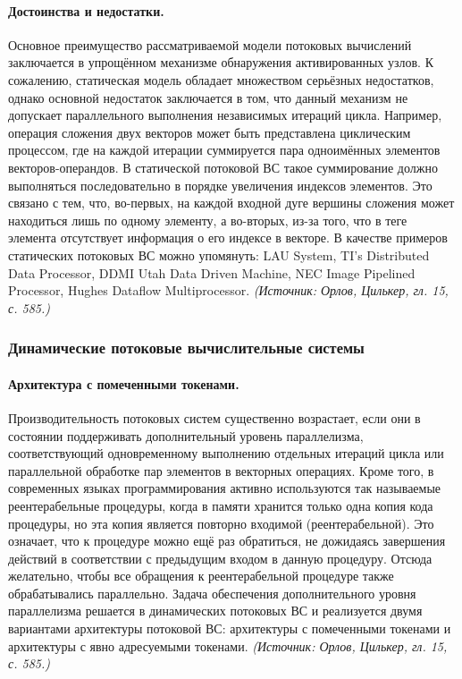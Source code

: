 \documentclass[a4paper,12pt]{article}
\begin{document}
\paragraph{Достоинства и недостатки.}
Основное преимущество рассматриваемой модели потоковых вычислений заключается в упрощённом механизме обнаружения активированных узлов. К сожалению, статическая модель обладает множеством серьёзных недостатков, однако основной недостаток заключается в том, что данный механизм не допускает параллельного выполнения независимых итераций цикла. Например, операция сложения двух векторов может быть представлена циклическим процессом, где на каждой итерации суммируется пара одноимённых элементов векторов-операндов. В статической потоковой ВС такое суммирование должно выполняться последовательно в порядке увеличения индексов элементов. Это связано с тем, что, во-первых, на каждой входной дуге вершины сложения может находиться лишь по одному элементу, а во-вторых, из-за того, что в теге элемента отсутствует информация о его индексе в векторе. В качестве примеров статических потоковых ВС можно упомянуть: LAU System, TI’s Distributed Data Processor, DDMI Utah Data Driven Machine, NEC Image Pipelined Processor, Hughes Dataflow Multiprocessor.
\textit{(Источник: Орлов, Цилькер, гл. 15, с. 585.)}

\subsubsection{Динамические потоковые вычислительные системы}

\paragraph{Архитектура с помеченными токенами.}
Производительность потоковых систем существенно возрастает, если они в состоянии поддерживать дополнительный уровень параллелизма, соответствующий одновременному выполнению отдельных итераций цикла или параллельной обработке пар элементов в векторных операциях. Кроме того, в современных языках программирования активно используются так называемые реентерабельные процедуры, когда в памяти хранится только одна копия кода процедуры, но эта копия является повторно входимой (реентерабельной). Это означает, что к процедуре можно ещё раз обратиться, не дожидаясь завершения действий в соответствии с предыдущим входом в данную процедуру. Отсюда желательно, чтобы все обращения к реентерабельной процедуре также обрабатывались параллельно. Задача обеспечения дополнительного уровня параллелизма решается в динамических потоковых ВС и реализуется двумя вариантами архитектуры потоковой ВС: архитектуры с помеченными токенами и архитектуры с явно адресуемыми токенами.
\textit{(Источник: Орлов, Цилькер, гл. 15, с. 585.)}
\end{document}
